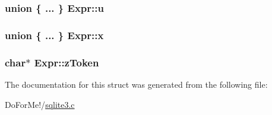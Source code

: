 \hypertarget{struct_expr_a5a43a51aa0ee7afc9babcdc337dd77db}{
\subsubsection[{u}]{\setlength{\rightskip}{0pt plus 5cm}union \{ ... \}   Expr\-::u}}\label{struct_expr_a5a43a51aa0ee7afc9babcdc337dd77db}
\hypertarget{struct_expr_a9ff6313055718299e20a19e551dcbf0a}{
\subsubsection[{x}]{\setlength{\rightskip}{0pt plus 5cm}union \{ ... \}   Expr\-::x}}\label{struct_expr_a9ff6313055718299e20a19e551dcbf0a}
\hypertarget{struct_expr_af1f6b0c5fcfdd18a41f682b74e13c950}{
\subsubsection[{z\-Token}]{\setlength{\rightskip}{0pt plus 5cm}char$\ast$ Expr\-::z\-Token}}\label{struct_expr_af1f6b0c5fcfdd18a41f682b74e13c950}


The documentation for this struct was generated from the following file\-:\begin{DoxyCompactItemize}
\item 
Do\-For\-Me!/\hyperlink{sqlite3_8c}{sqlite3.\-c}\end{DoxyCompactItemize}
